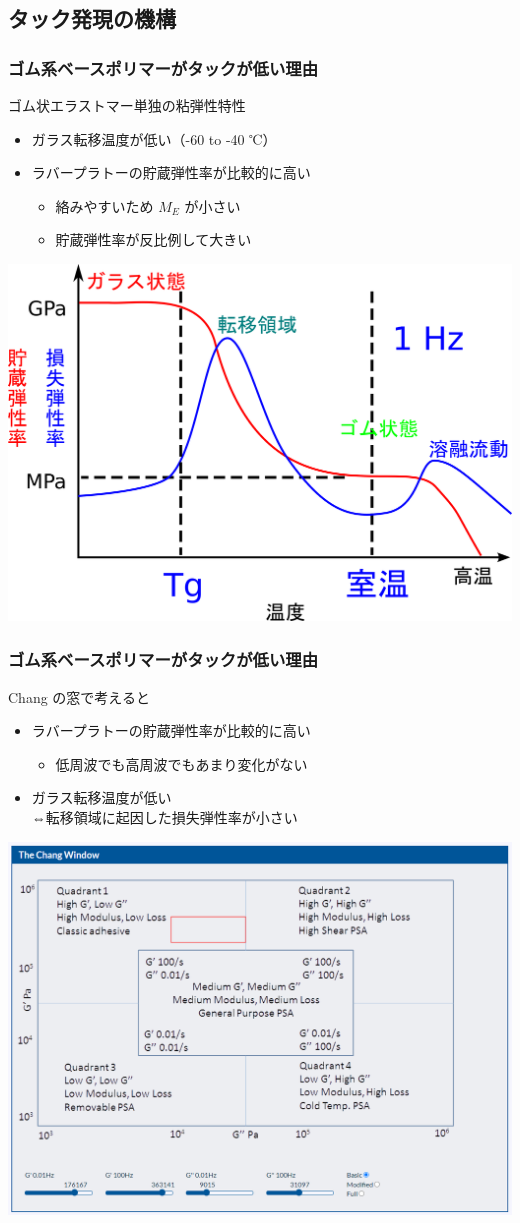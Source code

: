 \documentclass[12pt, dvipdfmx]{beamer}
\begin{document}
\subsection{タック発現の機構}
\begin{frame}
	\frametitle{ゴム系ベースポリマーがタックが低い理由}
		\begin{block}{ゴム状エラストマー単独の粘弾性特性}
		\begin{itemize}
			\item ガラス転移温度が低い（-60 to -40 ℃）
			\item ラバープラトーの貯蔵弾性率が比較的に高い
			\begin{itemize}
				\item 絡みやすいため $M_E$ が小さい
				\item 貯蔵弾性率が反比例して大きい
			\end{itemize}
		\end{itemize}
	\end{block}
		\centering
			\includegraphics[width=.5\textwidth]{dynamic_ViscoElast_Temp_rubber.png}
\end{frame}

\begin{frame}
	\frametitle{ゴム系ベースポリマーがタックが低い理由}
	\begin{block}{Chang の窓で考えると}
		\begin{itemize}
			\item ラバープラトーの貯蔵弾性率が比較的に高い
			\begin{itemize}
				\item 低周波でも高周波でもあまり変化がない
			\end{itemize}
			\item ガラス転移温度が低い\\⇔転移領域に起因した損失弾性率が小さい
		\end{itemize}
	\end{block}
		\centering
			\includegraphics[width=.45\textwidth]{ChangFrequencies_rubber.png}
\end{frame}
\end{document}
